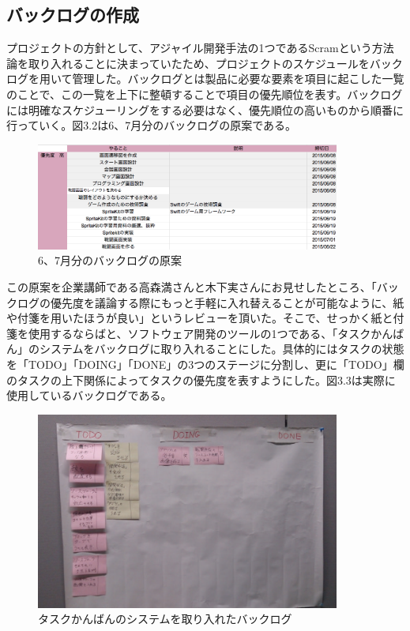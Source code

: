 \documentclass[openany,11pt,papersize]{jsbook}
\begin{document}
\subsection{バックログの作成}
\par プロジェクトの方針として、アジャイル開発手法の1つであるScramという方法論を取り入れることに決まっていたため、プロジェクトのスケジュールをバックログを用いて管理した。バックログとは製品に必要な要素を項目に起こした一覧のことで、この一覧を上下に整頓することで項目の優先順位を表す。バックログには明確なスケジューリングをする必要はなく、優先順位の高いものから順番に行っていく。図3.2は6、7月分のバックログの原案である。

\begin{figure}[H]
\begin{center}
\includegraphics[width=10cm, bb=0 0 1020 359]{img/SprintBacklog.png}
\end{center}
\caption{6、7月分のバックログの原案}
\end{figure}

\par この原案を企業講師である高森満さんと木下実さんにお見せしたところ、「バックログの優先度を議論する際にもっと手軽に入れ替えることが可能なように、紙や付箋を用いたほうが良い」というレビューを頂いた。そこで、せっかく紙と付箋を使用するならばと、ソフトウェア開発のツールの1つである、「タスクかんばん」のシステムをバックログに取り入れることにした。具体的にはタスクの状態を「TODO」「DOING」「DONE」の3つのステージに分割し、更に「TODO」欄のタスクの上下関係によってタスクの優先度を表すようにした。図3.3は実際に使用しているバックログである。

\begin{figure}[H]
\begin{center}
\includegraphics[width=10cm, bb=0 0 1206 783]{img/TaskKanban.png}
\end{center}
\caption{タスクかんばんのシステムを取り入れたバックログ}
\end{figure}
\end{document}
